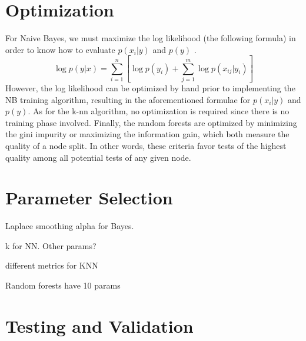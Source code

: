 \documentclass{acm_proc_article-sp}
\begin{document}
\section{Optimization}
For Naive Bayes, we must maximize the log likelihood (the following formula) in order to know how to evaluate $p(x_i|y)$ and $p(y)$ \cite{pineaul5}. 
\[
\log p(y | x) = \sum_{i=1}^n [\log p(y_i) + \sum_{j=1}^m \log p(x_{ij} | y_i)]
\]
However, the log likelihood can be optimized by hand prior to implementing the NB training algorithm, resulting in the aforementioned formulae for $p(x_i|y)$ and $p(y)$. As for the k-nn algorithm, no optimization is required since there is no training phase involved. Finally, the random forests are optimized by minimizing the gini impurity or maximizing the information gain, which both measure the quality of a node split. In other words, these criteria favor tests of the highest quality among all potential tests of any given node.


\section{Parameter Selection}
Laplace smoothing alpha for Bayes.

k for NN. Other params?

different metrics for KNN

Random forests have 10 params 

\newpage
\section{Testing and Validation}
\end{document}
